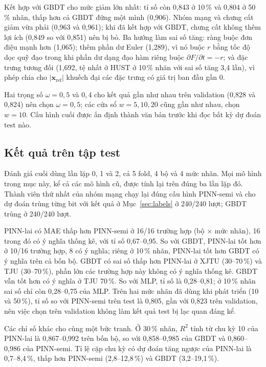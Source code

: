 \documentclass[12pt,a4paper,oneside]{report}
\theoremstyle{plain}
\theoremstyle{definition}
\begin{document}
Kết hợp với GBDT cho mức giảm lớn nhất: tỉ số còn 0{,}843 ở 10\,\% và 0{,}804 ở 50\,\% nhãn, thấp hơn cả
GBDT đứng một mình (0{,}906). Nhóm mạng và chưng cất giảm vừa phải (0{,}963 và 0{,}961); khi đã kết hợp với GBDT,
chưng cất không thêm lợi ích (0{,}849 so với 0{,}851) nên bị bỏ. Ba hướng làm sai số tăng: ràng buộc đơn điệu mạnh
hơn (1{,}065); thêm phần dư Euler (1{,}289), vì nó buộc $r$ bằng tốc độ dọc quỹ đạo trong khi phần dư dạng đạo hàm
riêng buộc $\partial F/\partial t = -r$; và đặc trưng tương đối (1{,}692, tệ nhất ở HUST ở 10\,\% nhãn với sai số tăng 3{,}4
lần), vì phép chia cho $|\mathbf{x}_\text{ref}|$ khuếch đại các đặc trưng có giá trị ban đầu gần 0.

Hai trọng số $\omega = 0{,}5$ và $0{,}4$ cho kết quả gần như nhau trên validation (0{,}828 và 0{,}824) nên chọn
$\omega = 0{,}5$; các cửa sổ $w = 5, 10, 20$ cũng gần như nhau, chọn $w = 10$. Cấu hình cuối được ấn định thành văn bản
trước khi đọc bất kỳ dự đoán test nào.

\subsection{Kết quả trên tập test}\label{sec:e20res}

Đánh giá cuối dùng lần lặp 0, 1 và 2, cả 5 fold, 4 bộ và 4 mức nhãn. Mọi mô hình trong mục này, kể cả các mô
hình cũ, được tính lại trên đúng ba lần lặp đó. Thành viên thứ nhất của nhóm mạng chạy lại đúng cấu hình PINN-semi
và cho dự đoán trùng từng bit với kết quả ở Mục~\ref{sec:labels} ở 240/240 lượt; GBDT trùng ở 240/240 lượt.




PINN-lai có MAE thấp hơn PINN-semi ở 16/16 trường hợp (bộ × mức nhãn), 16 trong đó có ý nghĩa
thống kê, với tỉ số 0{,}67--0{,}95. So với GBDT, PINN-lai tốt hơn ở 10/16 trường hợp, 8 có ý nghĩa; riêng ở 10\,\% nhãn, PINN-lai tốt hơn GBDT có ý nghĩa trên cả bốn bộ.
GBDT có sai số thấp hơn PINN-lai ở XJTU (30--70\,\%) và TJU (30--70\,\%), phần lớn các trường hợp này không có ý nghĩa thống kê. GBDT vẫn tốt hơn có ý nghĩa ở TJU 70\,\%.
So với MLP, tỉ số là 0{,}28--0{,}81; ở 10\,\% nhãn sai số chỉ còn 0{,}28--0{,}75 của MLP. Trên hai mức nhãn đã dùng khi phát
triển (10 và 50\,\%), tỉ số so với PINN-semi trên test là 0{,}805, gần với 0{,}823 trên validation, nên việc
chọn trên validation không làm kết quả test bị lạc quan đáng kể.



Các chỉ số khác cho cùng một bức tranh. Ở 30\,\% nhãn, $R^2$ tính từ chu kỳ 10 của PINN-lai là 0{,}867--0{,}992 trên bốn bộ,
so với 0{,}858--0{,}985 của GBDT và 0{,}860--0{,}986 của PINN-semi. Tỉ lệ cặp chu kỳ có dự đoán tăng ngược của PINN-lai là
0{,}7--8{,}4\,\%, thấp hơn PINN-semi (2{,}8--12{,}8\,\%) và GBDT (3{,}2--19{,}1\,\%).
\end{document}
